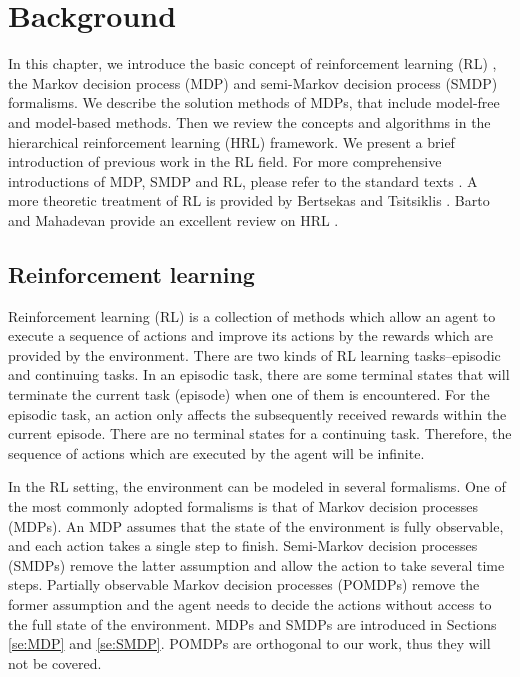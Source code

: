 \chapter{Background}
\label{ch:RL}

In this chapter, we introduce the basic concept of reinforcement learning (RL)
, the Markov decision process (MDP) and semi-Markov decision process (SMDP) formalisms. We describe the solution methods of MDPs, that include model-free and model-based 
methods. Then we review the concepts and algorithms in the hierarchical reinforcement learning (HRL) framework. 
We present a brief introduction of previous work in the RL field.
For more comprehensive introductions of MDP, SMDP and RL, please refer to the standard texts
\cite{Howard1960, Puterman94, SuttonIntro, KevinIntro}.
A more theoretic treatment of RL is provided by Bertsekas and Tsitsiklis \cite{Neurodynamic}.
Barto and Mahadevan provide an excellent review on HRL \cite{HRLSurvey}.

\section{Reinforcement learning}
\label{se:RL}
Reinforcement learning (RL) is a collection of methods which allow an agent to execute
a sequence of actions and improve its actions by the rewards which are provided by the environment.
There are two kinds of RL learning tasks--episodic and continuing tasks.
In an episodic task, there are some terminal states that will terminate
the current task (episode) when one of them is encountered.
For the episodic task, an action only affects the subsequently received rewards
within the current episode.
There are no terminal states for a continuing task. Therefore, the sequence of actions which
are executed by the agent will be infinite. 

In the RL setting, the environment can be modeled in several formalisms.
One of the most commonly adopted formalisms is that of Markov decision processes (MDPs).
An MDP assumes that the state of the environment is fully observable, and each action takes a single
step to finish. Semi-Markov decision processes (SMDPs) remove the latter assumption and allow
the action to take several time steps. Partially observable Markov decision processes (POMDPs) remove
the former assumption and the agent needs to decide the actions without access to the full state
of the environment.
MDPs and SMDPs are introduced in Sections \ref{se:MDP} and \ref{se:SMDP}.
POMDPs are orthogonal to our work, thus they will not be covered.

